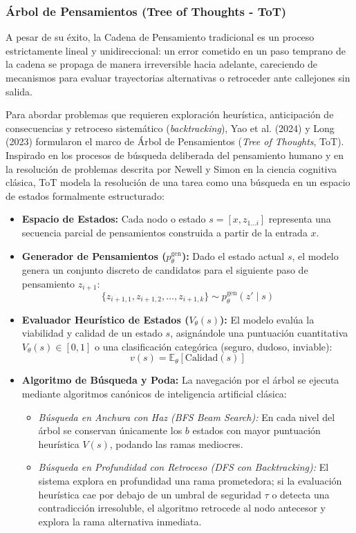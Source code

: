 \subsubsection{Árbol de Pensamientos (Tree of Thoughts - ToT)}

A pesar de su éxito, la Cadena de Pensamiento tradicional es un proceso estrictamente lineal y unidireccional: un error cometido en un paso temprano de la cadena se propaga de manera irreversible hacia adelante, careciendo de mecanismos para evaluar trayectorias alternativas o retroceder ante callejones sin salida.

Para abordar problemas que requieren exploración heurística, anticipación de consecuencias y retroceso sistemático (\textit{backtracking}), Yao et al. (2024) y Long (2023) formularon el marco de Árbol de Pensamientos (\textit{Tree of Thoughts}, ToT). Inspirado en los procesos de búsqueda deliberada del pensamiento humano y en la resolución de problemas descrita por Newell y Simon en la ciencia cognitiva clásica, ToT modela la resolución de una tarea como una búsqueda en un espacio de estados formalmente estructurado:

\begin{itemize}
    \item \textbf{Espacio de Estados:} Cada nodo o estado $s = [x, z_{1 \dots i}]$ representa una secuencia parcial de pensamientos construida a partir de la entrada $x$.
    \item \textbf{Generador de Pensamientos ($p_\theta^{\mathrm{gen}}$):} Dado el estado actual $s$, el modelo genera un conjunto discreto de candidatos para el siguiente paso de pensamiento $z_{i+1}$:
    \begin{equation}
    \{z_{i+1, 1}, z_{i+1, 2}, \dots, z_{i+1, k}\} \sim p_\theta^{\mathrm{gen}}(z' \mid s)
    \end{equation}
    \item \textbf{Evaluador Heurístico de Estados ($V_\theta(s)$):} El modelo evalúa la viabilidad y calidad de un estado $s$, asignándole una puntuación cuantitativa $V_\theta(s) \in [0, 1]$ o una clasificación categórica (seguro, dudoso, inviable):
    \begin{equation}
    v(s) = \mathbb{E}_{\theta}[\mathrm{Calidad}(s)]
    \end{equation}
    \item \textbf{Algoritmo de Búsqueda y Poda:} La navegación por el árbol se ejecuta mediante algoritmos canónicos de inteligencia artificial clásica:
    \begin{itemize}
        \item \textit{Búsqueda en Anchura con Haz (BFS Beam Search):} En cada nivel del árbol se conservan únicamente los $b$ estados con mayor puntuación heurística $V(s)$, podando las ramas mediocres.
        \item \textit{Búsqueda en Profundidad con Retroceso (DFS con Backtracking):} El sistema explora en profundidad una rama prometedora; si la evaluación heurística cae por debajo de un umbral de seguridad $\tau$ o detecta una contradicción irresoluble, el algoritmo retrocede al nodo antecesor y explora la rama alternativa inmediata.
    \end{itemize}
\end{itemize}

